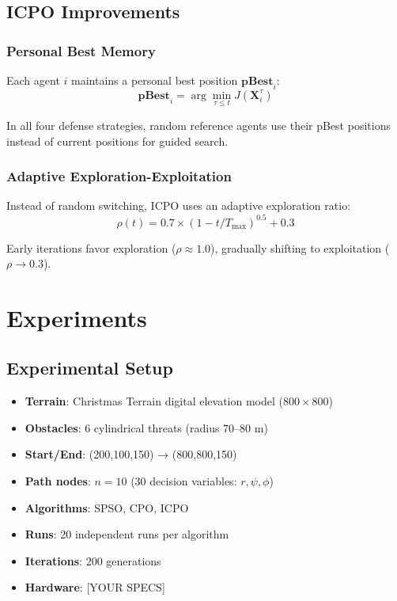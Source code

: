 \documentclass[12pt,a4paper]{article}
\begin{document}
\subsection{ICPO Improvements}

\subsubsection{Personal Best Memory}
Each agent $i$ maintains a personal best position $\mathbf{pBest}_i$:
\begin{equation}
    \mathbf{pBest}_i = \arg\min_{\tau \leq t} J(\mathbf{X}_i^\tau)
\end{equation}

In all four defense strategies, random reference agents use their pBest 
positions instead of current positions for guided search.

\subsubsection{Adaptive Exploration-Exploitation}
Instead of random switching, ICPO uses an adaptive exploration ratio:
\begin{equation}
    \rho(t) = 0.7 \times (1 - t/T_{\max})^{0.5} + 0.3
\end{equation}

Early iterations favor exploration ($\rho \approx 1.0$), 
gradually shifting to exploitation ($\rho \rightarrow 0.3$).

\section{Experiments}

\subsection{Experimental Setup}
\begin{itemize}
    \item \textbf{Terrain}: Christmas Terrain digital elevation model ($800\times800$)
    \item \textbf{Obstacles}: 6 cylindrical threats (radius 70--80 m)
    \item \textbf{Start/End}: (200,100,150) → (800,800,150)
    \item \textbf{Path nodes}: $n=10$ (30 decision variables: $r, \psi, \phi$)
    \item \textbf{Algorithms}: SPSO, CPO, ICPO
    \item \textbf{Runs}: 20 independent runs per algorithm
    \item \textbf{Iterations}: 200 generations
    \item \textbf{Hardware}: [YOUR SPECS]
\end{itemize}
\end{document}
